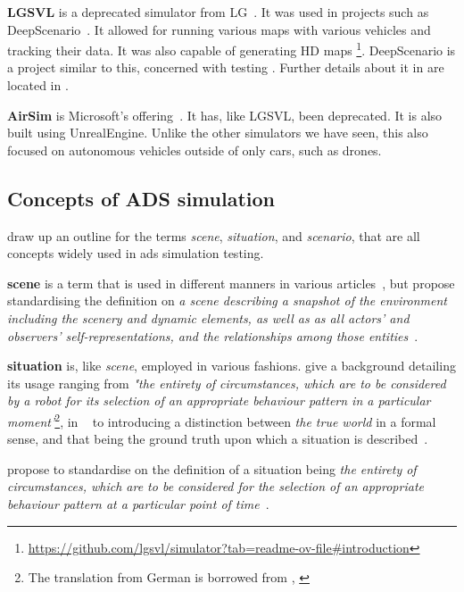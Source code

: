 \textbf{LGSVL} is a deprecated simulator from LG~\cite{lgsvl}. It was used in projects such
as DeepScenario~\cite{DeepScenario}. It allowed for running various maps with various vehicles and
tracking their data. It was also capable of generating HD
maps \footnote{\url{https://github.com/lgsvl/simulator?tab=readme-ov-file\#introduction}}.
DeepScenario is a project similar to this, concerned with testing . Further details
about it in are located in .

\textbf{AirSim} is Microsoft's offering~\cite{airsim}. It has, like LGSVL,
been deprecated. It is also built using UnrealEngine. Unlike the other
simulators we have seen, this also focused on autonomous vehicles outside of
only cars, such as drones.


\subsection{Concepts of ADS simulation}\label{sec:adsSimConcepts}

\citeauthor{scenes} draw up an outline for the terms \textit{scene}, \textit{situation}, and
\textit{scenario}, that are all concepts widely used in \acrshort{ads} simulation testing.

\textbf{scene} is a term that is used in different manners in various
articles~\cite[982]{scenes}, but \citeauthor{scenes} propose standardising the definition on
\textit{a scene describing a snapshot of the environment including the scenery and dynamic elements,
    as well as  as all actors’ and observers’ self-representations, and the relationships among those entities}~\cite[983]{scenes}.

\textbf{situation} is, like \textit{scene}, employed in various fashions. \citeauthor{scenes}
give a background detailing its usage ranging from \textit{"the entirety of circumstances,
    which are to be considered by a robot for its selection of an appropriate behaviour pattern in a
    particular moment'}\footnote{The translation from German is borrowed from \citeauthor{scenes},
    \cite[984]{scenes}}, in  \citeauthor{scenarioTysk}~\cite[3]{scenarioTysk} to
\citeauthor{schmidtScenario} introducing a distinction between \textit{the true world} in a formal
sense, and that being the ground truth upon which a situation is
described~\cite[892]{schmidtScenario}.

\citeauthor{scenes} propose to standardise on the definition of a situation being \textit{
    the entirety of circumstances, which  are to be considered for the selection of an
    appropriate behaviour pattern at a particular point of time}~\cite[985]{scenes}.

